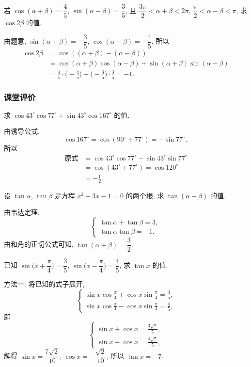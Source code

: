\lianxi
\begin{exercise}[s]
    若 $\cos(\alpha+\beta)=\dfrac45$, $\sin(\alpha-\beta)=\dfrac35$, 
    且 $\dfrac{3\pi}2< \alpha+\beta< 2\pi$, 
    $\dfrac\pi2<\alpha-\beta<\pi$, 求 $\cos 2\beta$ 的值.
\end{exercise}
\beginsolution
    由题意, $\sin(\alpha+\beta)= -\dfrac35$, $\cos(\alpha-\beta)= -\dfrac45$, 所以
    \[\begin{aligned}
        \cos2\beta
        &= \cos((\alpha+\beta)- (\alpha-\beta))\\
        &= \cos(\alpha+\beta)\cos(\alpha-\beta)
            + \sin(\alpha+\beta)\sin(\alpha-\beta)\\
        &= \frac45\cdot\biggl(-\frac45\biggr)
            + \biggl(-\frac35\biggr)\cdot\frac35
         = -1.
    \end{aligned}\]
\endsolution

\subsubsection{课堂评价}
\begin{exercise}
    求 $\cos 43^\circ\cos 77^\circ+\sin 43^\circ\cos 167^\circ$ 的值.
\end{exercise}
\beginsolution
    由诱导公式,
    \[\cos 167^\circ= \cos (90^\circ+ 77^\circ)= -\sin77^\circ,\]
    所以
    \[\begin{aligned}
        \text{原式} 
        &= \cos43^\circ\cos77^\circ- \sin43^\circ\sin77^\circ\\
        &= \cos(43^\circ+77^\circ)= \cos120^\circ\\
        &= -\frac12.
    \end{aligned}\]
\endsolution

\begin{exercise}
    设 $\tan\alpha$, $\tan\beta$ 是方程 $x^2 -3x-1=0$ 的两个根, 求 $\tan(\alpha+\beta)$ 的值.
\end{exercise}
\beginsolution
    由韦达定理, 
    \[\left\{\!\!\begin{array}{l}
        \tan\alpha+ \tan\beta= 3,\\
        \tan\alpha\tan\beta= -1.
    \end{array}\right.\]
    由和角的正切公式可知, $\tan(\alpha+\beta)= \dfrac32$.
\endsolution

\begin{exercise}
    已知 $\sin\Big(x+\dfrac\pi4\Big)=\dfrac35$, 
    $\sin\Big(x-\dfrac\pi4\Big)=\dfrac45$, 求 $\tan x$ 的值.
\end{exercise}
\beginsolution
    方法一: 将已知的式子展开,
    \[\left\{\!\!\begin{array}{l}
        \sin x\cos\frac\pi4+ \cos x\sin\frac\pi4= \frac35,\\[6pt]
        \sin x\cos\frac\pi4- \cos x\sin\frac\pi4= \frac45,
    \end{array}\right.\]
    即
    \[\left\{\!\!\begin{array}{l}
        \sin x+\cos x= \frac{3\sqrt2}{5},\\[6pt]
        \sin x-\cos x= \frac{4\sqrt2}{5},
    \end{array}\right.\]
    解得 $\sin x= \dfrac{7\sqrt2}{10}$, $\cos x= -\dfrac{\sqrt2}{10}$, 所以 $\tan x= -7$.

